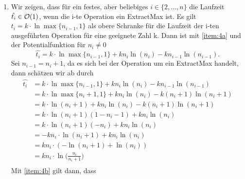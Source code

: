 \documentclass{scrartcl} %
\begin{document}
\begin{aufgabe}
\begin{enumerate}[label=(\alph*)]
            Für $n_{i-1}=0$ ist der Fall trivialer und es gilt $\hat{t_i}=k \cdot \ln \max\{n_{i-1},1\} + kn_i\ln(n_i)$. Dann ergibt sich, da $n_1=1$, sofort $$\hat{t_i}=k \cdot \ln (1) + k\ln(1) = 0 = \log(1)= \log(n_i).$$ Daher gilt für $\hat{t_i} \in \BigO(\log n_i)$.
            \item \label{item:4d}Wir zeigen, dass für ein festes, aber beliebiges $i \in \{2, ..., n \}$ die Laufzeit $\hat{t_i} \in \operatorname{\mathcal{O}}(1)$, wenn die i-te Operation ein {\ttfamily ExtractMax} ist. Es gilt $t_i = k \cdot \ln \max\{n_{i-1},1\}$ als obere Schranke für die Laufzeit der i-ten ausgeführten Operation für eine geeignete Zahl k. Dann ist mit \ref{item:4a} und der Potentialfunktion für $n_{i} \neq 0$ $$\hat{t_i}=k \cdot \ln \max\{n_{i-1},1\} + kn_i\ln(n_i)-kn_{i-1}\ln(n_{i-1}).$$ 
            Sei $n_{i-1} = n_{i}+1$, da es sich bei der Operation um ein {\ttfamily ExtractMax} handelt, dann schätzen wir ab durch 
            \begin{align*} 
            \hat{t_i}&=k \cdot \ln \max\{n_{i-1},1\} + kn_i\ln(n_i)-kn_{i-1}\ln(n_{i-1})\\ 
            &=k \cdot \ln \max\{n_{i}+1,1\} + kn_i\ln(n_i)-k(n_{i}+1)\ln(n_{i}+1)\\
            &=k \cdot \ln (n_{i}+1)+ kn_i\ln(n_i)-k(n_{i}+1)\ln(n_{i}+1)\\
            &=k \cdot \ln (n_{i}+1) (1 - n_{i} -1)+ kn_i\ln(n_i)\\
            &=k \cdot \ln (n_{i}+1) (-n_{i})+ kn_i\ln(n_i)\\
            &=-kn_i \cdot \ln (n_{i}+1) + kn_i\ln(n_i)\\
            &=kn_i \cdot (-\ln (n_{i}+1) + \ln(n_i))\\
            &=kn_i \cdot \ln\Big(\frac{n_i}{n_{i}+1}\Big)\\
            \end{align*}
            Mit \ref{item:4b} gilt dann, dass

\end{enumerate}
\end{aufgabe}
\end{document}
